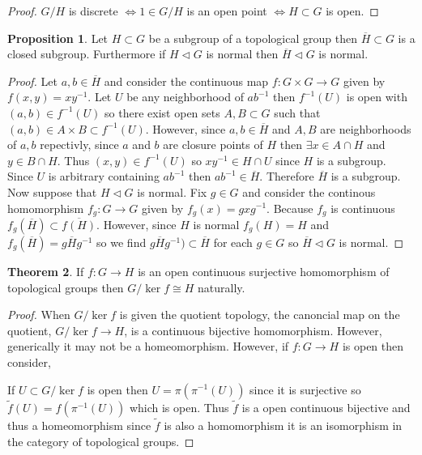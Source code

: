 \documentclass[12pt]{article}
\theoremstyle{remark}
\theoremstyle{definition}
\newtheorem{theorem}{Theorem}[section]
\newtheorem{proposition}[theorem]{Proposition}
\begin{document}
\begin{proof}
$G / H$ is discrete $\iff 1 \in G / H$ is an open point $\iff H \subset G$ is open. 
\end{proof}

\begin{proposition}
Let $H \subset G$ be a subgroup of a topological group then $\overline{H} \subset G$ is a closed subgroup. Furthermore if $H \triangleleft G$ is normal then $\overline{H} \triangleleft G$ is normal.
\end{proposition}

\begin{proof}
Let $a,b \in \overline{H}$ and consider the continuous map $f : G \times G \to G$ given by $f(x,y) = x y^{-1}$. Let $U$ be any neighborhood of $ab^{-1}$ then $f^{-1}(U)$ is open with $(a, b) \in f^{-1}(U)$ so there exist open sets $A, B \subset G$ such that $(a, b) \in A \times B \subset f^{-1}(U)$. However, since $a, b \in \overline{H}$ and $A,B$ are neighborhoods of $a,b$ repectivly, since $a$ and $b$ are closure points of $H$ then $\exists x \in A \cap H$ and $y \in B \cap H$. Thus $(x, y) \in f^{-1}(U)$ so $xy^{-1} \in H \cap U$ since $H$ is a subgroup. Since $U$ is arbitrary containing $a b^{-1}$ then $a b^{-1} \in \overline{H}$. Therefore $\overline{H}$ is a subgroup. 
\bigskip\\
Now suppose that $H \triangleleft G$ is normal. Fix $g \in G$ and consider the continous homomorphism $f_g : G \to G$ given by $f_g(x) = g x g^{-1}$. Because $f_g$ is continuous $f_g(\overline{H}) \subset \overline{f(H)}$. However, since $H$ is normal $f_g(H) = H$ and $f_g(\overline{H}) = g \overline{H} g^{-1}$ so we find $g \overline{H} g^{-1}) \subset \overline{H}$ for each $g \in G$ so $\overline{H} \triangleleft G$ is normal. 
\end{proof}



\begin{theorem} \label{quotient_condition}
If $f : G \to H$ is an open continuous surjective homomorphism of topological groups then $G / \ker{f} \cong H$ naturally.
\end{theorem}

\begin{proof}
When $G / \ker{f}$ is given the quotient topology, the canoncial map on the quotient, $G / \ker{f} \to H$, is a continuous bijective homomorphism. However, generically it may not be a homeomorphism. However, if $f : G \to H$ is open then consider,
\begin{center}
\end{center}
If $U \subset G / \ker{f}$ is open then $U = \pi(\pi^{-1}(U))$ since it is surjective so $\tilde{f}(U) = f(\pi^{-1}(U))$ which is open. Thus $\tilde{f}$ is a open continuous bijective and thus a homeomorphism since $\tilde{f}$ is also a homomorphism it is an isomorphism in the category of topological groups.
\end{proof}
\end{document}
